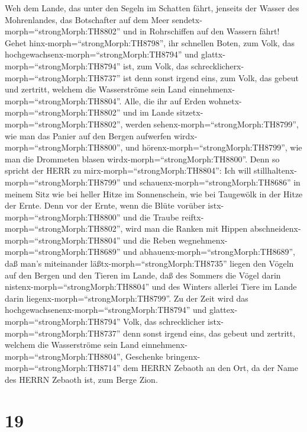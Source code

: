  Weh dem Lande, das unter den Segeln im Schatten fährt,
jenseits der Wasser des Mohrenlandes,  das Botschafter auf
dem Meer sendetx-morph=``strongMorph:TH8802'' und in Rohrschiffen auf
den Wassern fährt! Gehet hinx-morph=``strongMorph:TH8798'', ihr
schnellen Boten, zum Volk, das
hochgewachsenx-morph=``strongMorph:TH8794'' und
glattx-morph=``strongMorph:TH8794'' ist, zum Volk, das
schrecklicherx-morph=``strongMorph:TH8737'' ist denn sonst irgend eins,
zum Volk, das gebeut und zertritt, welchem die Wasserströme sein Land
einnehmenx-morph=``strongMorph:TH8804''.  Alle, die ihr auf
Erden wohnetx-morph=``strongMorph:TH8802'' und im Lande
sitzetx-morph=``strongMorph:TH8802'', werden
sehenx-morph=``strongMorph:TH8799'', wie man das Panier auf den Bergen
aufwerfen wirdx-morph=``strongMorph:TH8800'', und
hörenx-morph=``strongMorph:TH8799'', wie man die Drommeten blasen
wirdx-morph=``strongMorph:TH8800''.  Denn so spricht der
HERR zu mirx-morph=``strongMorph:TH8804'': Ich will
stillhaltenx-morph=``strongMorph:TH8799'' und
schauenx-morph=``strongMorph:TH8686'' in meinem Sitz wie bei heller
Hitze im Sonnenschein, wie bei Taugewölk in der Hitze der Ernte.
 Denn vor der Ernte, wenn die Blüte vorüber
istx-morph=``strongMorph:TH8800'' und die Traube
reiftx-morph=``strongMorph:TH8802'', wird man die Ranken mit Hippen
abschneidenx-morph=``strongMorph:TH8804'' und die Reben
wegnehmenx-morph=``strongMorph:TH8689'' und
abhauenx-morph=``strongMorph:TH8689'',  daß man's
miteinander läßtx-morph=``strongMorph:TH8735'' liegen den Vögeln auf den
Bergen und den Tieren im Lande, daß des Sommers die Vögel darin
nistenx-morph=``strongMorph:TH8804'' und des Winters allerlei Tiere im
Lande darin liegenx-morph=``strongMorph:TH8799''.  Zu der
Zeit wird das hochgewachsenenx-morph=``strongMorph:TH8794'' und
glattex-morph=``strongMorph:TH8794'' Volk, das schrecklicher
istx-morph=``strongMorph:TH8737'' denn sonst irgend eins, das gebeut und
zertritt, welchem die Wasserströme sein Land
einnehmenx-morph=``strongMorph:TH8804'', Geschenke
bringenx-morph=``strongMorph:TH8714'' dem HERRN Zebaoth an den Ort, da
der Name des HERRN Zebaoth ist, zum Berge Zion.

\hypertarget{section-18}{%
\section{19}\label{section-18}}

